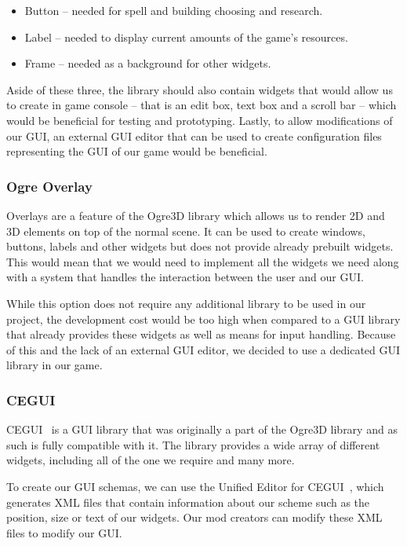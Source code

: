 \begin{itemize}
    \item Button -- needed for spell and building choosing and research.
    \item Label -- needed to display current amounts of the game's resources.
    \item Frame -- needed as a background for other widgets.
\end{itemize}

Aside of these three, the library should also contain widgets that would allow us to create in game console -- that is an edit box, 
text box and a scroll bar -- which would be beneficial for testing and prototyping. Lastly, to allow modifications of our GUI, an external 
GUI editor that can be used to create configuration files representing the GUI of our game would be beneficial.

\subsubsection{Ogre Overlay}

Overlays are a feature of the Ogre3D library which allows us to render 2D and 3D elements on top of the normal scene. It can be used to
create windows, buttons, labels and other widgets but does not provide already prebuilt widgets. This would mean that we would need
to implement all the widgets we need along with a system that handles the interaction between the user and our GUI.

While this option does not require any additional library to be used in our project, the development cost would be too high
when compared to a GUI library that already provides these widgets as well as means for input handling. Because of this and the lack of
an external GUI editor, we decided to use a dedicated GUI library in our game.

\subsubsection{CEGUI}

CEGUI~\cite{CEGUI} is a GUI library that was originally a part of the Ogre3D library and as such is fully compatible with it. The library
provides a wide array of different widgets, including all of the one we require and many more.

To create our GUI schemas, we can use the Unified Editor for CEGUI~\cite{CEED}, which generates XML files that contain information
about our scheme such as the position, size or text of our widgets. Our mod creators can modify these XML files to modify our GUI.

